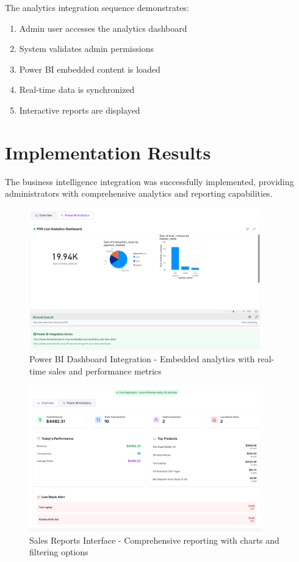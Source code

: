 The analytics integration sequence demonstrates:
\begin{enumerate}
  \item Admin user accesses the analytics dashboard
  \item System validates admin permissions
  \item Power BI embedded content is loaded
  \item Real-time data is synchronized
  \item Interactive reports are displayed
\end{enumerate}

\section{Implementation Results}

The business intelligence integration was successfully implemented, providing administrators with comprehensive analytics and reporting capabilities.

\begin{figure}[H]
  \centering
  \includegraphics[width=0.9\textwidth]{working app screenshots/powerbiembedded.png}
  \caption{Power BI Dashboard Integration - Embedded analytics with real-time sales and performance metrics}
  \label{fig:powerbiembedded}
\end{figure}

\begin{figure}[H]
  \centering
  \includegraphics[width=0.9\textwidth]{working app screenshots/salesreports.png}
  \caption{Sales Reports Interface - Comprehensive reporting with charts and filtering options}
  \label{fig:salesreports}
\end{figure}

